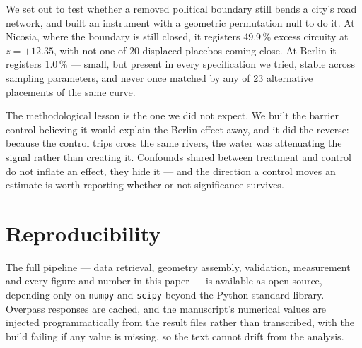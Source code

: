 \documentclass[11pt,a4paper]{article}
\begin{document}
We set out to test whether a removed political boundary still bends a city's
road network, and built an instrument with a geometric permutation null to do
it. At Nicosia, where the boundary is still closed, it registers 49.9\,\%
excess circuity at $z = +12.35$, with not one of 20 displaced
placebos coming close. At Berlin it registers 1.0\,\% --- small, but
present in every specification we tried, stable across sampling parameters, and
never once matched by any of 23 alternative placements of the same
curve.

The methodological lesson is the one we did not expect. We built the barrier
control believing it would explain the Berlin effect away, and it did the
reverse: because the control trips cross the same rivers, the water was
attenuating the signal rather than creating it. Confounds shared between
treatment and control do not inflate an effect, they hide it --- and the
direction a control moves an estimate is worth reporting whether or not
significance survives.

\section*{Reproducibility}

The full pipeline --- data retrieval, geometry assembly, validation, measurement
and every figure and number in this paper --- is available as open source,
depending only on \texttt{numpy} and \texttt{scipy} beyond the Python standard
library. Overpass responses are cached, and the manuscript's numerical values
are injected programmatically from the result files rather than transcribed,
with the build failing if any value is missing, so the text cannot drift from
the analysis.
\end{document}
